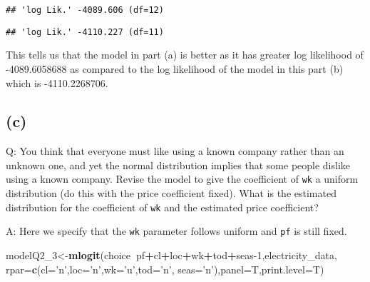 \documentclass[
]{article}
\newenvironment{Shaded}{\begin{snugshade}}{\end{snugshade}}
\newcommand{\DataTypeTok}[1]{\textcolor[rgb]{0.13,0.29,0.53}{#1}}
\newcommand{\DecValTok}[1]{\textcolor[rgb]{0.00,0.00,0.81}{#1}}
\newcommand{\KeywordTok}[1]{\textcolor[rgb]{0.13,0.29,0.53}{\textbf{#1}}}
\newcommand{\NormalTok}[1]{#1}
\newcommand{\OperatorTok}[1]{\textcolor[rgb]{0.81,0.36,0.00}{\textbf{#1}}}
\newcommand{\StringTok}[1]{\textcolor[rgb]{0.31,0.60,0.02}{#1}}
\begin{document}
\begin{Shaded}
\end{Shaded}

\begin{verbatim}
## 'log Lik.' -4089.606 (df=12)
\end{verbatim}

\begin{Shaded}
\end{Shaded}

\begin{verbatim}
## 'log Lik.' -4110.227 (df=11)
\end{verbatim}

This tells us that the model in part (a) is better as it has greater log
likelihood of -4089.6058688 as compared to the log likelihood of the
model in this part (b) which is -4110.2268706.

\hypertarget{c}{%
\subsection{(c)}\label{c}}

Q: You think that everyone must like using a known company rather than
an unknown one, and yet the normal distribution implies that some people
dislike using a known company. Revise the model to give the coefficient
of \texttt{wk} a uniform distribution (do this with the price
coefficient fixed). What is the estimated distribution for the
coefficient of \texttt{wk} and the estimated price coefficient?


A: Here we specify that the \texttt{wk} parameter follows uniform and
\texttt{pf} is still fixed.

\begin{Shaded}
\begin{Highlighting}[]
\NormalTok{modelQ2_}\DecValTok{3}\NormalTok{<-}\KeywordTok{mlogit}\NormalTok{(choice}\OperatorTok{~}\NormalTok{pf}\OperatorTok{+}\NormalTok{cl}\OperatorTok{+}\NormalTok{loc}\OperatorTok{+}\NormalTok{wk}\OperatorTok{+}\NormalTok{tod}\OperatorTok{+}\NormalTok{seas}\DecValTok{-1}\NormalTok{,electricity_data, }\DataTypeTok{rpar=}\KeywordTok{c}\NormalTok{(}\DataTypeTok{cl=}\StringTok{'n'}\NormalTok{,}\DataTypeTok{loc=}\StringTok{'n'}\NormalTok{,}\DataTypeTok{wk=}\StringTok{'u'}\NormalTok{,}\DataTypeTok{tod=}\StringTok{'n'}\NormalTok{, }\DataTypeTok{seas=}\StringTok{'n'}\NormalTok{),}\DataTypeTok{panel=}\NormalTok{T,}\DataTypeTok{print.level=}\NormalTok{T)}
\end{Highlighting}
\end{Shaded}
\end{document}
